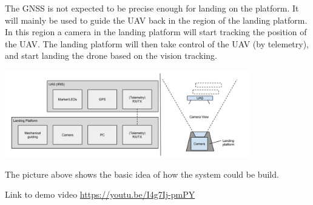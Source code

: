 The GNSS is not expected to be precise enough for landing on the platform. It will mainly be used to guide the UAV back in the region of the landing platform. In this region a camera in the landing platform will start tracking the position of the UAV. The landing platform will then take control of the UAV (by telemetry), and start landing the drone based on the vision tracking.
\begin{center}
	\includegraphics[width=0.8\textwidth]{imgs/introduction}
\end{center}
The picture above shows the basic idea of how the system could be build.

Link to demo video \url{https://youtu.be/I4g7Ij-pmPY}